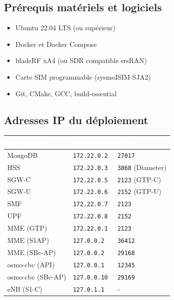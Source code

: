 \documentclass[11pt,a4paper]{article}
\newcommand{\ip}[1]{\texttt{\color{pkfblue}#1}}
\newcommand{\port}[1]{\texttt{\color{pkforange}#1}}
\begin{document}
\subsection{Prérequis matériels et logiciels}

\begin{itemize}[leftmargin=2cm]
    \item[\faServer] Ubuntu 22.04 LTS (ou supérieur)
    \item[\faDocker] Docker et Docker Compose
    \item[\faBroadcastTower] bladeRF xA4 (ou SDR compatible srsRAN)
    \item[\faSimCard] Carte SIM programmable (sysmoISIM-SJA2)
    \item[\faCode] Git, CMake, GCC, build-essential
\end{itemize}

\subsection{Adresses IP du déploiement}

\begin{center}
\begin{tabular}{|l|l|l|}
\hline
\rowcolor{pkfblue}
\textcolor{white}{\textbf{Composant}} & \textcolor{white}{\textbf{Adresse IP}} & \textcolor{white}{\textbf{Port}} \\
\hline
MongoDB & \ip{172.22.0.2} & \port{27017} \\
\hline
HSS & \ip{172.22.0.3} & \port{3868} (Diameter) \\
\hline
SGW-C & \ip{172.22.0.5} & \port{2123} (GTP-C) \\
\hline
SGW-U & \ip{172.22.0.6} & \port{2152} (GTP-U) \\
\hline
SMF & \ip{172.22.0.7} & \port{2123} \\
\hline
UPF & \ip{172.22.0.8} & \port{2152} \\
\hline
MME (GTP) & \ip{172.22.0.1} & \port{2123} \\
\hline
MME (S1AP) & \ip{127.0.0.2} & \port{36412} \\
\hline
MME (SBc-AP) & \ip{127.0.0.2} & \port{29168} \\
\hline
osmo-cbc (API) & \ip{127.0.0.1} & \port{12345} \\
\hline
osmo-cbc (SBc-AP) & \ip{127.0.0.10} & \port{29169} \\
\hline
eNB (S1-C) & \ip{127.0.1.1} & - \\
\hline
\end{tabular}
\end{center}
\end{document}
